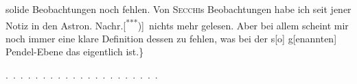 solide Beobachtungen noch fehlen. Von \textsc{Secchi}s Beobachtungen habe ich seit
jener Notiz in den Astron. Nachr.[\textsuperscript{***})]\begingroup\renewcommand{\thefootnote}{}\endgroup\ nichts mehr gelesen. Aber bei allem
scheint mir noch immer eine klare Definition dessen zu fehlen, was bei der
s[o] g[enannten] Pendel-Ebene das eigentlich  ist.\}
\par\noindent .\ .\ .\ .\ .\ .\ .\ .\ .\ .\ .\ .\ .\ .\ .\ .\ .\ .\ .\ .\ .
\clearpage\endgroup

